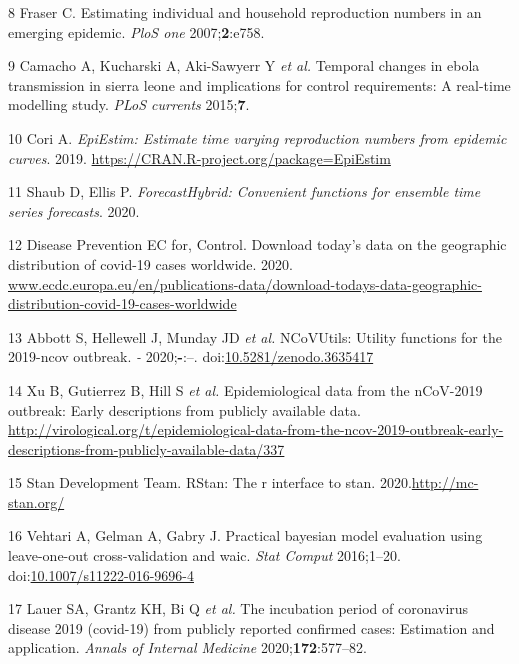 \documentclass[]{article}
\begin{document}
\leavevmode\hypertarget{ref-Fraser:2007hf}{}%
8 Fraser C. Estimating individual and household reproduction numbers in
an emerging epidemic. \emph{PloS one} 2007;\textbf{2}:e758.

\leavevmode\hypertarget{ref-Camacho:2015dv}{}%
9 Camacho A, Kucharski A, Aki-Sawyerr Y \emph{et al.} Temporal changes
in ebola transmission in sierra leone and implications for control
requirements: A real-time modelling study. \emph{PLoS currents}
2015;\textbf{7}.

\leavevmode\hypertarget{ref-EpiEstim}{}%
10 Cori A. \emph{EpiEstim: Estimate time varying reproduction numbers
from epidemic curves}. 2019.
\url{https://CRAN.R-project.org/package=EpiEstim}

\leavevmode\hypertarget{ref-forecastHybrid}{}%
11 Shaub D, Ellis P. \emph{ForecastHybrid: Convenient functions for
ensemble time series forecasts}. 2020.

\leavevmode\hypertarget{ref-ecdc_data}{}%
12 Disease Prevention EC for, Control. Download today's data on the
geographic distribution of covid-19 cases worldwide. 2020.
\url{www.ecdc.europa.eu/en/publications-data/download-todays-data-geographic-distribution-covid-19-cases-worldwide}

\leavevmode\hypertarget{ref-NCoVUtils}{}%
13 Abbott S, Hellewell J, Munday JD \emph{et al.} NCoVUtils: Utility
functions for the 2019-ncov outbreak. \emph{-} 2020;\textbf{-}:--.
doi:\href{https://doi.org/10.5281/zenodo.3635417}{10.5281/zenodo.3635417}

\leavevmode\hypertarget{ref-kraemer2020epidemiological}{}%
14 Xu B, Gutierrez B, Hill S \emph{et al.} Epidemiological data from the
nCoV-2019 outbreak: Early descriptions from publicly available data.
\url{http://virological.org/t/epidemiological-data-from-the-ncov-2019-outbreak-early-descriptions-from-publicly-available-data/337}

\leavevmode\hypertarget{ref-rstan}{}%
15 Stan Development Team. RStan: The r interface to stan.
2020.\url{http://mc-stan.org/}

\leavevmode\hypertarget{ref-Vehtari2016}{}%
16 Vehtari A, Gelman A, Gabry J. Practical bayesian model evaluation
using leave-one-out cross-validation and waic. \emph{Stat Comput}
2016;1--20.
doi:\href{https://doi.org/10.1007/s11222-016-9696-4}{10.1007/s11222-016-9696-4}

\leavevmode\hypertarget{ref-incubationperiod}{}%
17 Lauer SA, Grantz KH, Bi Q \emph{et al.} The incubation period of
coronavirus disease 2019 (covid-19) from publicly reported confirmed
cases: Estimation and application. \emph{Annals of Internal Medicine}
2020;\textbf{172}:577--82.
\end{document}
